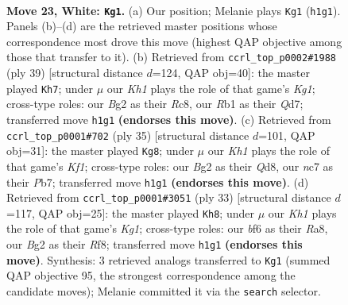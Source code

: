 \documentclass[11pt]{article}
\begin{document}
\begin{figure}[p]
\label{fig:thought-m42}
\end{figure}

\clearpage

\begin{figure}[p]\centering
\begin{subfigure}{0.46\textwidth}\centering
\resizebox{\linewidth}{!}{%
\newchessgame
\chessboard[
  setfen={1rbq1r1k/p1n5/5bpp/2pp1p1n/P4P2/1P3NP1/Q2NP1BP/1RB1R2K w - - 2 23},
  showmover=false,
  pgfstyle=straightmove, color=movearrow, markmove={h1-g1}
]}
\caption{}
\end{subfigure}\hfill
\begin{subfigure}{0.46\textwidth}\centering
\resizebox{\linewidth}{!}{%
\newchessgame
\chessboard[
  setfen={1rr3k1/3qppb1/p2p1n1p/1p2nP2/5R1B/P1N4P/1PP1B1P1/1R1Q3K b - - 0 20},
  showmover=false,
  pgfstyle=straightmove, color=movearrow, markmove={g8-h7}
]}
\caption{}
\end{subfigure}
\\[4pt]
\begin{subfigure}{0.46\textwidth}\centering
\resizebox{\linewidth}{!}{%
\newchessgame
\chessboard[
  setfen={3q1k1r/pp1nrppp/2p2nb1/5p2/3P3N/6PP/PPPB2B1/R2Q1RK1 b - - 1 18},
  showmover=false,
  pgfstyle=straightmove, color=movearrow, markmove={f8-g8}
]}
\caption{}
\end{subfigure}\hfill
\begin{subfigure}{0.46\textwidth}\centering
\resizebox{\linewidth}{!}{%
\newchessgame
\chessboard[
  setfen={r4rk1/1pqb2pp/2nbpn2/p2p2B1/P7/2P2N1P/1PB2PP1/R2QRNK1 b - - 5 17},
  showmover=false,
  pgfstyle=straightmove, color=movearrow, markmove={g8-h8}
]}
\caption{}
\end{subfigure}
\caption{\textbf{Move 23, White: \texttt{Kg1}.} (a) Our position; Melanie plays \texttt{Kg1} (\texttt{h1g1}). Panels (b)--(d) are the retrieved master positions whose correspondence most drove this move (highest QAP objective among those that transfer to it). (b) Retrieved from \texttt{ccrl\_top\_p0002\#1988} (ply 39) [structural distance $d$=124, QAP obj=40]: the master played \texttt{Kh7}; under $\mu$ our \emph{Kh1} plays the role of that game's \emph{Kg1}; cross-type roles: our \emph{B}g2 as their \emph{R}c8, our \emph{R}b1 as their \emph{Q}d7; transferred move \texttt{h1g1} \textbf{(endorses this move)}. (c) Retrieved from \texttt{ccrl\_top\_p0001\#702} (ply 35) [structural distance $d$=101, QAP obj=31]: the master played \texttt{Kg8}; under $\mu$ our \emph{Kh1} plays the role of that game's \emph{Kf1}; cross-type roles: our \emph{B}g2 as their \emph{Q}d8, our \emph{n}c7 as their \emph{P}b7; transferred move \texttt{h1g1} \textbf{(endorses this move)}. (d) Retrieved from \texttt{ccrl\_top\_p0001\#3051} (ply 33) [structural distance $d$=117, QAP obj=25]: the master played \texttt{Kh8}; under $\mu$ our \emph{Kh1} plays the role of that game's \emph{Kg1}; cross-type roles: our \emph{b}f6 as their \emph{R}a8, our \emph{B}g2 as their \emph{R}f8; transferred move \texttt{h1g1} \textbf{(endorses this move)}. Synthesis: 3 retrieved analogs transferred to \texttt{Kg1} (summed QAP objective 95, the strongest correspondence among the candidate moves); Melanie committed it via the \texttt{search} selector.}

\end{figure}
\end{document}
